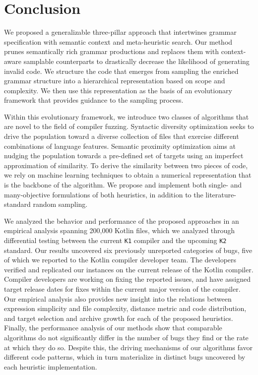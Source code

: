 \chapter{\label{cha:conc}Conclusion}

We proposed a generalizable three-pillar approach that intertwines
grammar specification with semantic context and meta-heuristic search.
Our method prunes semantically rich grammar productions
and replaces them with context-aware samplable counterparts
to drastically decrease the likelihood of generating invalid code.
We structure the code that emerges from sampling
the enriched grammar structure into a hierarchical
representation based on scope and complexity.
We then use this representation as the basis
of an evolutionary framework that provides guidance
to the sampling process.

Within this evolutionary framework, we introduce two
classes of algorithms that are novel to the field
of compiler fuzzing.
Syntactic diversity optimization seeks to
drive the population toward a diverse collection of files
that exercise different combinations of language features.
Semantic proximity optimization aims at nudging
the population towards a pre-defined set of targets
using an imperfect approximation of similarity.
To derive the similarity between
two pieces of code, we rely on machine learning
techniques to obtain a numerical representation
that is the backbone of the algorithm.
We propose and implement both single- and many-objective
formulations of both heuristics, in addition to
the literature-standard random sampling.

We analyzed the behavior and performance of the proposed
approaches in an empirical analysis spanning 200,000 Kotlin files,
which we analyzed through differential testing between the current \texttt{K1}
compiler and the upcoming \texttt{K2} standard.
Our results uncovered six previously unreported categories of bugs,
five of which we reported to the Kotlin compiler developer team.
The developers verified and replicated our instances
on the current release of the Kotlin compiler.
Compiler developers are working on fixing the reported issues,
and have assigned target release dates for fixes within the current
major version of the compiler.
Our empirical analysis also provides new insight into
the relations between expression simplicity and file complexity,
distance metric and code distribution, and target selection
and archive growth for each of the proposed heuristics.
Finally, the performance analysis of our methods show
that  comparable algorithms do not significantly
differ in the number of bugs they find or the rate at which they do so.
Despite this, the driving mechanisms of our algorithms
favor different code patterns, which in turn materialize
in distinct bugs uncovered by each heuristic implementation.

